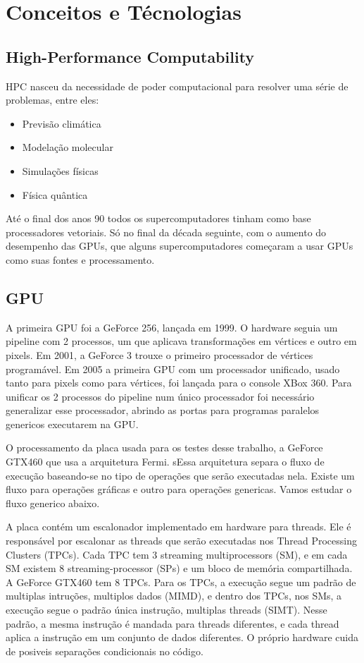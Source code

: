 \section{Conceitos e Técnologias}
\subsection{High-Performance Computability}
HPC nasceu da necessidade de poder computacional para resolver uma série de problemas, entre eles:
\begin{itemize}
  \item Previsão climática
  \item Modelação molecular
  \item Simulações físicas
  \item Física quântica
\end{itemize}
Até o final dos anos 90 todos os supercomputadores tinham como base processadores vetoriais. Só no final da década seguinte, 
com o aumento do desempenho das GPUs, que alguns supercomputadores começaram a usar GPUs como suas fontes e processamento.
\subsection{GPU}
A primeira GPU foi a GeForce 256, lançada em 1999. O hardware seguia um pipeline com 2 processos, um que aplicava transformações
em vértices e outro em pixels. Em 2001, a GeForce 3 trouxe o primeiro processador de vértices programável. Em 2005 a primeira
GPU com um processador unificado, usado tanto para pixels como para vértices, foi lançada para o console XBox 360. Para unificar
os 2 processos do pipeline num único processador foi necessário generalizar esse processador, abrindo as portas para programas
paralelos genericos executarem na GPU.

O processamento da placa usada para os testes desse trabalho, a GeForce GTX460 que usa a arquitetura Fermi. sEssa arquitetura
separa o fluxo de execução baseando-se no tipo de operações que serão executadas nela. Existe um fluxo para
operações gráficas e outro para operações genericas. Vamos estudar o fluxo generico abaixo.

A placa contém um escalonador implementado em hardware para threads. Ele é responsável por escalonar as threads que serão
executadas nos Thread Processing Clusters (TPCs). Cada TPC tem 3 streaming multiprocessors (SM), 
e em cada SM existem 8 streaming-processor (SPs) e um bloco de memória compartilhada. A GeForce GTX460 tem 8 TPCs.
Para os TPCs, a execução segue um padrão de multiplas intruções, multiplos dados (MIMD), e dentro dos TPCs, nos SMs, 
a execução segue o padrão única instrução, multiplas threads (SIMT). Nesse padrão, a mesma instrução é mandada para 
threads diferentes, e cada thread aplica a instrução em um conjunto de dados diferentes. O próprio hardware cuida de 
posiveis separações condicionais no código.


